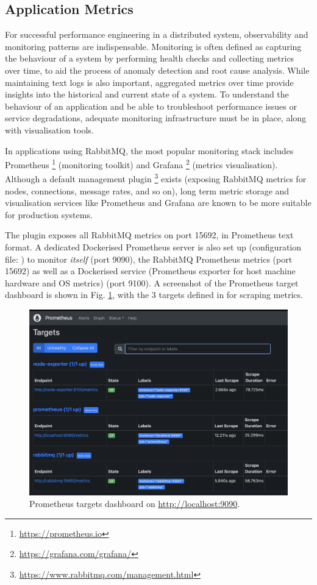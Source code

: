 \subsection{Application Metrics}

For successful performance engineering in a distributed system, observability and monitoring patterns are indispensable. Monitoring is often defined as capturing the behaviour of a system by performing health checks and collecting metrics over time, to aid the process of anomaly detection and root cause analysis. While maintaining text logs is also important, aggregated metrics over time provide insights into the historical and current state of a system. To understand the behaviour of an application and be able to troubleshoot performance issues or service degradations, adequate monitoring infrastructure must be in place, along with visualisation tools.

In applications using RabbitMQ, the most popular monitoring stack includes Prometheus \footnote{\url{https://prometheus.io}} (monitoring toolkit) and Grafana \footnote{\url{https://grafana.com/grafana/}} (metrics visualisation). Although a default management plugin \footnote{\url{https://www.rabbitmq.com/management.html}} exists (exposing RabbitMQ metrics for nodes, connections, message rates, and so on), long term metric storage and visualisation services like Prometheus and Grafana are known to be more suitable for production systems.

The  plugin exposes all RabbitMQ metrics on port 15692, in Prometheus text format. A dedicated Dockerised Prometheus server is also set up (configuration file: ) to monitor \textit{itself} (port 9090), the RabbitMQ Prometheus metrics (port 15692) as well as a Dockerised  service (Prometheus exporter for host machine hardware and OS metrics) (port 9100). A screenshot of the Prometheus target dashboard is shown in Fig.
\ref{fig:prom-targets}, with the 3 targets defined in  for scraping metrics.

\begin{figure}[H]
  \centering
  \includegraphics[width=0.75\linewidth]{./assets/images/case-study-02/prom-targets.png}
  \caption{Prometheus targets dashboard on \url{http://localhost:9090}.}
  \label{fig:prom-targets}
\end{figure}

